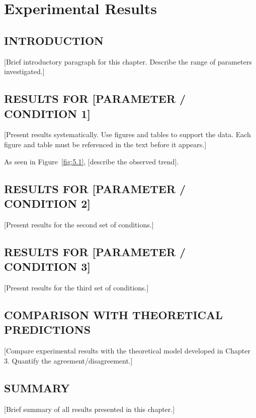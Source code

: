 \chapter{Experimental Results}

\section{INTRODUCTION}

[Brief introductory paragraph for this chapter. Describe
the range of parameters investigated.]

\section{RESULTS FOR [PARAMETER / CONDITION 1]}

[Present results systematically. Use figures and tables
to support the data. Each figure and table must be
referenced in the text before it appears.]

As seen in Figure~\ref{fig:5.1}, [describe the observed trend].


\section{RESULTS FOR [PARAMETER / CONDITION 2]}

[Present results for the second set of conditions.]

\section{RESULTS FOR [PARAMETER / CONDITION 3]}

[Present results for the third set of conditions.]

\section{COMPARISON WITH THEORETICAL PREDICTIONS}

[Compare experimental results with the theoretical model
developed in Chapter 3. Quantify the agreement/disagreement.]

\section{SUMMARY}

[Brief summary of all results presented in this chapter.]
